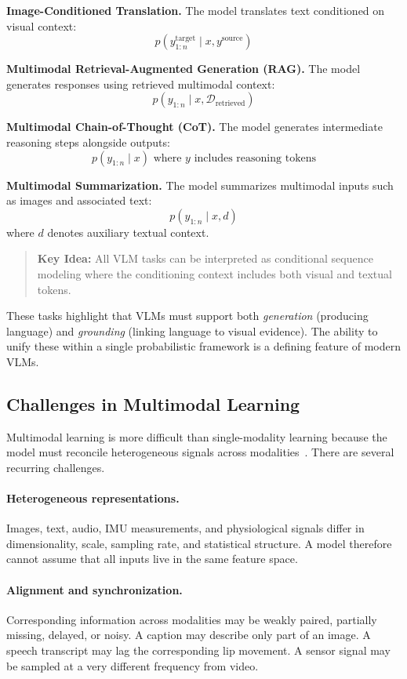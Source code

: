 \documentclass{article}
\newenvironment{keyidea}{\begin{quote}\noindent\textbf{Key Idea:} }{\end{quote}}
\begin{document}
\textbf{Image-Conditioned Translation.}
The model translates text conditioned on visual context:
\[
p(y_{1:n}^{\text{target}} \mid x, y^{\text{source}})
\]

\textbf{Multimodal Retrieval-Augmented Generation (RAG).}
The model generates responses using retrieved multimodal context:
\[
p(y_{1:n} \mid x, \mathcal{D}_{\text{retrieved}})
\]

\textbf{Multimodal Chain-of-Thought (CoT).}
The model generates intermediate reasoning steps alongside outputs:
\[
p(y_{1:n} \mid x) \text{ where } y \text{ includes reasoning tokens}
\]

\textbf{Multimodal Summarization.}
The model summarizes multimodal inputs such as images and associated text:
\[
p(y_{1:n} \mid x, d)
\]
where $d$ denotes auxiliary textual context.

\begin{keyidea}
All VLM tasks can be interpreted as conditional sequence modeling where the conditioning context includes both visual and textual tokens.
\end{keyidea}

These tasks highlight that VLMs must support both \emph{generation} (producing language) and \emph{grounding} (linking language to visual evidence). The ability to unify these within a single probabilistic framework is a defining feature of modern VLMs.


\subsection{Challenges in Multimodal Learning}
Multimodal learning is more difficult than single-modality learning because the model must reconcile heterogeneous signals across modalities~\cite{baltrusaitis2018}. There are several recurring challenges.

\paragraph{Heterogeneous representations.} Images, text, audio, IMU measurements, and physiological signals differ in dimensionality, scale, sampling rate, and statistical structure. A model therefore cannot assume that all inputs live in the same feature space.

\paragraph{Alignment and synchronization.} Corresponding information across modalities may be weakly paired, partially missing, delayed, or noisy. A caption may describe only part of an image. A speech transcript may lag the corresponding lip movement. A sensor signal may be sampled at a very different frequency from video.
\end{document}
